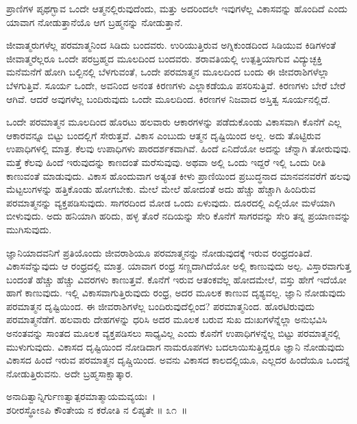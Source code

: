 \begin{artha}
ಪ್ರಾಣಿಗಳ ಪೃಥಗ್ಭಾವ ಒಂದೇ ಆತ್ಮನಲ್ಲಿರುವುದೆಂದು, ಮತ್ತು ಅದರಿಂದಲೇ ಇವುಗಳೆಲ್ಲ ವಿಕಾಸವನ್ನು ಹೊಂದಿದೆ ಎಂದು ಯಾವಾಗ ನೋಡುತ್ತಾನೆಯೊ ಆಗ ಬ್ರಹ್ಮನನ್ನು ನೋಡುತ್ತಾನೆ.
\end{artha}

ಜೀವಾತ್ಮರುಗಳೆಲ್ಲ ಪರಮಾತ್ಮನಿಂದ ಸಿಡಿದು ಬಂದವರು. ಉರಿಯುತ್ತಿರುವ ಅಗ್ನಿಕುಂಡದಿಂದ ಸಿಡಿಯುವ ಕಿಡಿಗಳಂತೆ ಜೀವಾತ್ಮರೆಲ್ಲರೂ ಒಂದೇ ಪರಬ್ರಹ್ಮದ ಮೂಲದಿಂದ ಬಂದವರು. ಶರಾವತಿಯಲ್ಲಿ ಉತ್ಪತ್ತಿಯಾಗುವ ವಿದ್ಯುಚ್ಛಕ್ತಿ ಮನೆಮನೆಗೆ ಹೋಗಿ ಬಲ್ಬಿನಲ್ಲಿ ಬೆಳಗುವಂತೆ, ಒಂದೇ ಪರಮಾತ್ಮನ ಮೂಲದಿಂದ ಬಂದು ಈ ಜೀವರಾಶಿಗಳೆಲ್ಲಾ ಬೆಳಗುತ್ತಿವೆ. ಸೂರ್ಯ ಒಂದೇ, ಅವನಿಂದ ಅನಂತ ಕಿರಣಗಳು ಎಲ್ಲಾಕಡೆಯೂ ಪಸರಿಸುತ್ತಿವೆ. ಕಿರಣಗಳು ಬೇರೆ ಬೇರೆ ಆಗಿವೆ. ಆದರೆ ಅವುಗಳೆಲ್ಲ ಬಂದಿರುವುದು ಒಂದೇ ಮೂಲದಿಂದ. ಕಿರಣಗಳ ನಿಜವಾದ ಅಸ್ತಿತ್ವ ಸೂರ್ಯನಲ್ಲಿದೆ.

ಒಂದೇ ಪರಮಾತ್ಮನ ಮೂಲದಿಂದ ಹೊರಟು ಹಲವಾರು ಆಕಾರಗಳನ್ನು ಪಡೆದುಕೊಂಡು ವಿಕಾಸವಾಗಿ ಕೊನೆಗೆ ಎಲ್ಲ ಆಕಾರವನ್ನೂ ಬಿಟ್ಟು ಬಂದಲ್ಲಿಗೆ ಸೇರುತ್ತವೆ. ವಿಕಾಸ ಎಂಬುದು ಆತ್ಮನ ದೃಷ್ಟಿಯಿಂದ ಅಲ್ಲ. ಅದು ತೊಟ್ಟಿರುವ ಉಪಾಧಿಗಳಲ್ಲಿ ಮಾತ್ರ. ಕೆಲವು ಉಪಾಧಿಗಳು ಪಾರದರ್ಶಕವಾಗಿವೆ. ಹಿಂದೆ ಏನಿದೆಯೋ ಅದನ್ನು ಚೆನ್ನಾಗಿ ತೋರುವುವು. ಮತ್ತೆ ಕೆಲವು ಹಿಂದೆ ಇರುವುದನ್ನು ಕಾಣದಂತೆ ಮರೆಸುವುವು. ಅಥವಾ ಅಲ್ಲಿ ಒಂದು ಇದ್ದರೆ ಇಲ್ಲಿ ಒಂದು ರೀತಿ ಕಾಣುವಂತೆ ಮಾಡುವುದು. ವಿಕಾಸ ಹೊಂದುವಾಗ ಅತ್ಯಂತ ಕೀಳು ಪ್ರಾಣಿಯಿಂದ ಪ್ರಬುದ್ಧನಾದ ಮಾನವನವರೆಗೆ ಹಲವು ಮೆಟ್ಟಲುಗಳನ್ನು ಹತ್ತಿಕೊಂಡು ಹೋಗಬೇಕು. ಮೇಲೆ ಮೇಲೆ ಹೋದಂತೆ ಅದು ಹೆಚ್ಚು ಹೆಚ್ಚಾಗಿ ಹಿಂದಿರುವ ಪರಮಾತ್ಮನನ್ನು ವ್ಯಕ್ತಪಡಿಸುವುದು. ಸಾಗರದಿಂದ ಮೋಡ ಒಂದು ಏಳುವುದು. ದೂರದಲ್ಲಿ ಎಲ್ಲಿಯೋ ಮಳೆಯಾಗಿ ಬೀಳುವುದು. ಅದು ಹನಿಯಾಗಿ ಹರಿದು, ಹಳ್ಳ ತೊರೆ ನದಿಯನ್ನು ಸೇರಿ ಕೊನೆಗೆ ಸಾಗರವನ್ನು ಸೇರಿ ತನ್ನ ಪ್ರಯಾಣವನ್ನು ಮುಗಿಸುವುದು.

ಜ್ಞಾನಿಯಾದವನಿಗೆ ಪ್ರತಿಯೊಂದು ಜೀವರಾಶಿಯೂ ಪರಮಾತ್ಮನನ್ನು ನೋಡುವುದಕ್ಕೆ ಇರುವ ರಂಧ್ರದಂತಿದೆ. ವಿಕಾಸವೆನ್ನುವುದು ಆ ರಂಧ್ರದಲ್ಲಿ ಮಾತ್ರ. ಯಾವಾಗ ರಂಧ್ರ ಸಣ್ಣದಾಗಿದೆಯೋ ಅಲ್ಲಿ ಕಾಣುವುದು ಅಲ್ಪ. ವಿಸ್ತಾರವಾಗುತ್ತ ಬಂದಂತೆ ಹೆಚ್ಚು ಹೆಚ್ಚು ವಿವರಗಳು ಕಾಣುತ್ತವೆ. ಕೊನೆಗೆ ಇರುವ ಆತಂಕವೆಲ್ಲ ಹೋದಮೇಲೆ, ವಸ್ತು ಹೇಗೆ ಇದೆಯೋ ಹಾಗೆ ಕಾಣುವುದು. ಇಲ್ಲಿ ವಿಕಾಸವಾಗುತ್ತಿರುವುದು ರಂಧ್ರ, ಅದರ ಮೂಲಕ ಕಾಣುವ ದೃಶ್ಯವಲ್ಲ. ಜ್ಞಾನಿ ನೋಡುವುದು ಪರಮಾತ್ಮನ ದೃಷ್ಟಿಯಿಂದ. ಈ ಜೀವರಾಶಿಗಳೆಲ್ಲ ಬಂದಿರುವುದೆಲ್ಲಿಂದ? ಪರಮಾತ್ಮನಿಂದ. ಹೊರಟಿರುವುದು ಪರಮಾತ್ಮನೆಡೆಗೆ. ಹಲವಾರು ದೇಹಗಳನ್ನು ಧರಿಸಿ ಅದರ ಮೂಲಕ ಬರುವ ಸುಖ ದುಃಖಗಳೆನ್ನೆಲ್ಲಾ ಅನುಭವಿಸಿ ಅನಂತವನ್ನು ಸಾಂತದ ಮೂಲಕ ವ್ಯಕ್ತಪಡಿಸಲು ಸಾಧ್ಯವಿಲ್ಲ ಎಂದು ಕೊನೆಗೆ ಉಪಾಧಿಗಳನ್ನೆಲ್ಲ ಬಿಟ್ಟು ಪರಮಾತ್ಮನಲ್ಲಿ ಮುಳುಗುವುದು. ವಿಕಾಸದ ದೃಷ್ಟಿಯಿಂದ ನೋಡಿದಾಗ ನಾಮರೂಪಗಳು ಬದಲಾಯಿಸುತ್ತಿದ್ದರೂ ಜ್ಞಾನಿ ನೋಡುವುದು ವಿಕಾಸದ ಹಿಂದೆ ಇರುವ ಪರಮಾತ್ಮನ ದೃಷ್ಚಿಯಿಂದ. ಅವನು ವಿಕಾಸದ ಕಾಲದಲ್ಲಿಯೂ, ಎಲ್ಲದರ ಹಿಂದೆಯೂ ಒಂದನ್ನೆ ನೋಡುತ್ತಿರುವನು. ಅದೇ ಬ್ರಹ್ಮಸಾಕ್ಷಾತ್ಕಾರ.

\begin{shloka}
ಅನಾದಿತ್ವಾನ್ನಿರ್ಗುಣತ್ವಾತ್ಪರಮಾತ್ಮಾಯಮವ್ಯಯಃ~।\\ಶರೀರಸ್ಥೋಽಪಿ ಕೌಂತೇಯ ನ ಕರೋತಿ ನ ಲಿಪ್ಯತೇ \hfill॥ ೩೧~॥
\end{shloka}

